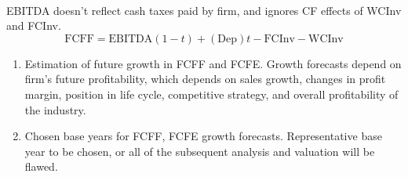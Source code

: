 \begin{remark} \\
EBITDA doesn't reflect cash taxes paid by firm, and ignores CF effects of WCInv and FCInv.
\begin{equation}
\text{FCFF} = \text{EBITDA}(1-t) + (\text{Dep})t - \text{FCInv} - \text{WCInv} \nonumber
\end{equation}
\end{remark}

\begin{remark} 
\begin{enumerate}[label=\roman*.]
\setlength{\itemsep}{0pt}
\item Estimation of future growth in FCFF and FCFE. Growth forecasts depend on firm's future profitability, which depends on sales growth, changes in profit margin, position in life cycle, competitive strategy, and overall profitability of the industry.
\item Chosen base years for FCFF, FCFE growth forecasts. Representative base year to be chosen, or all of the subsequent analysis and valuation will be flawed.
\end{enumerate}
\end{remark}